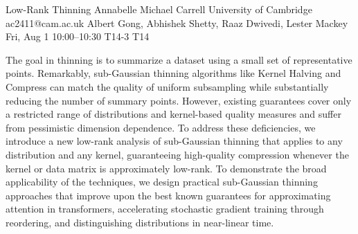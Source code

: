 \begin{talk}
  {Low-Rank Thinning}%
  {Annabelle Michael Carrell}%
  {University of Cambridge}%
  {ac2411@cam.ac.uk}%
  {Albert Gong, Abhishek Shetty, Raaz Dwivedi, Lester Mackey}%
  {}%
  {Fri, Aug 1 10:00–10:30}%
  {T14-3}%
  {T14}%
  
				
			
The goal in thinning is to summarize a dataset using a small set of representative points. Remarkably, sub-Gaussian thinning algorithms like Kernel Halving and Compress can match the quality of uniform subsampling while substantially reducing the number of summary points. However, existing guarantees cover only a restricted range of distributions and kernel-based quality measures and suffer from pessimistic dimension dependence. To address these deficiencies, we introduce a new low-rank analysis of sub-Gaussian thinning that applies to any distribution and any kernel, guaranteeing high-quality compression whenever the kernel or data matrix is approximately low-rank. To demonstrate the broad applicability of the techniques, we design practical sub-Gaussian thinning approaches that improve upon the best known guarantees for approximating attention in transformers, accelerating stochastic gradient training through reordering, and distinguishing distributions in near-linear time. 

\medskip

\end{talk}

